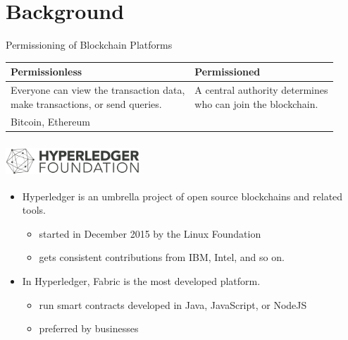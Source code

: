 \documentclass[xcolor=svgnames]{beamer}
\begin{document}
\section{Background}
\begin{frame}{Permissioning of Blockchain Platforms}

\begin{table}
\small
\renewcommand*{\arraystretch}{2}
\begin{tabular}{ll}
Permissionless                                                              & Permissioned                                                \\ \hline
\makecell[l]{Everyone can view the transaction data, \\make transactions, or send queries.} & \makecell[l]{A central authority determines \\who can join the blockchain.} \\
Bitcoin, Ethereum                                                           & \onslide<2->{Hyperledger Fabric}                                          \\
\end{tabular}
\end{table}

\end{frame}

\begin{frame}
\frametitle{
\includegraphics[height=1cm]{hyperledgerfoundation_horizontal-dark.png}
\qquad
{}
}

\begin{itemize}
\item Hyperledger is an umbrella project of open source blockchains and related tools.
\begin{itemize}
\item started in December 2015 by the Linux Foundation
\item gets consistent contributions from IBM, Intel, and so on.
\end{itemize}

\item<2-> In Hyperledger, Fabric is the most developed platform.
\begin{itemize}
\item run smart contracts developed in Java, JavaScript, or NodeJS
\item preferred by businesses
\end{itemize}
\end{itemize}
\end{frame}
\end{document}
